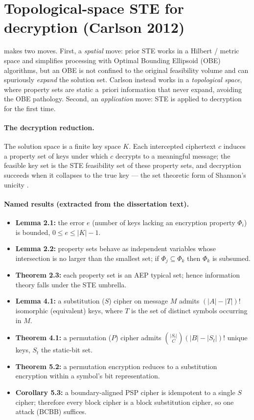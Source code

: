 \documentclass[11pt]{article}
\begin{document}
\section{Topological-space STE for decryption (Carlson 2012)}

\citet{carlson2012} makes two moves. First, a \emph{spatial} move: prior
STE works in a Hilbert / metric space and simplifies processing with
Optimal Bounding Ellipsoid (OBE) algorithms, but an OBE is not confined
to the original feasibility volume and can spuriously \emph{expand} the
solution set. Carlson instead works in a \emph{topological space}, where
property sets are static a~priori information that never expand, avoiding
the OBE pathology. Second, an \emph{application} move: STE is applied to
decryption for the first time.

\paragraph{The decryption reduction.} The solution space is a finite key
space $K$. Each intercepted ciphertext $c$ induces a property set of keys
under which $c$ decrypts to a meaningful message; the feasible key set is
the STE feasibility set of these property sets, and decryption succeeds
when it collapses to the true key --- the set theoretic form of Shannon's
unicity \citep{shannon1949}.

\paragraph{Named results (extracted from the dissertation text).}
\begin{itemize}
\item \textbf{Lemma 2.1:} the error $e$ (number of keys lacking an
  encryption property $\Phi_i$) is bounded, $0\le e\le|K|-1$.
\item \textbf{Lemma 2.2:} property sets behave as independent variables
  whose intersection is no larger than the smallest set; if
  $\Phi_j\subseteq\Phi_k$ then $\Phi_k$ is subsumed.
\item \textbf{Theorem 2.3:} each property set is an AEP typical set;
  hence information theory falls under the STE umbrella.
\item \textbf{Lemma 4.1:} a substitution ($S$) cipher on message $M$
  admits $(|A|-|T|)!$ isomorphic (equivalent) keys, where $T$ is the set
  of distinct symbols occurring in $M$.
\item \textbf{Theorem 4.1:} a permutation ($P$) cipher admits
  $\binom{|S_t|}{C}(|B|-|S_t|)!$ unique keys, $S_t$ the static-bit set.
\item \textbf{Theorem 5.2:} a permutation encryption reduces to a
  substitution encryption within a symbol's bit representation.
\item \textbf{Corollary 5.3:} a boundary-aligned PSP cipher is idempotent
  to a single $S$ cipher; therefore every block cipher is a block
  substitution cipher, so one attack (BCBB) suffices.
\end{itemize}
\end{document}

